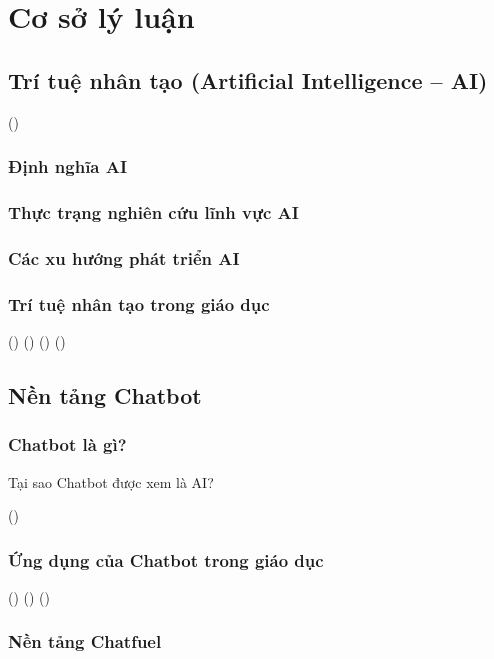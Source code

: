 \chapter{Cơ sở lý luận}

\section{Trí tuệ nhân tạo (Artificial Intelligence – AI)}
(\cite{nguyen2018tri})
\subsection{Định nghĩa AI}
\subsection{Thực trạng nghiên cứu lĩnh vực AI}
\subsection{Các xu hướng phát triển AI}
\subsection{Trí tuệ nhân tạo trong giáo dục}
(\cite{garito1991artificial})
(\cite{beck1996applications})
(\cite{goksel2019artificial})
(\cite{devedvzic2004web})

\section{Nền tảng Chatbot}
\subsection{Chatbot là gì?}\par
Tại sao Chatbot được xem là AI?\par
(\cite{bii2013chatbot})

\subsection{Ứng dụng của Chatbot trong giáo dục}
(\cite{10.1007/978-3-030-01689-0_23})
(\cite{hoang2011ung})
(\cite{hsu2012mobile})

\subsection{Nền tảng Chatfuel}

